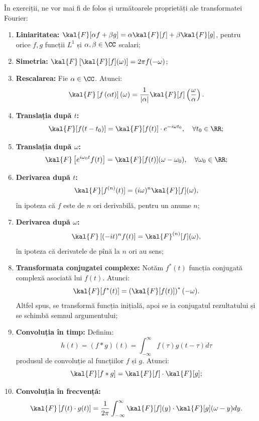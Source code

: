 În exerciții, ne vor mai fi de folos și următoarele proprietăți ale
transformatei Fourier:
\begin{enumerate}[(1)]
    \item \textbf{Liniaritatea:} $ \kal{F}[\alpha f + \beta g] = \alpha \kal{F}[f] + \beta \kal{F}[g] $,
        pentru orice $ f, g $ funcții $ L^1 $ și $ \alpha, \beta \in \CC $ scalari;
    \item \textbf{Simetria:} $ \kal{F}\left[\kal{F}[f](\omega)\right] = 2\pi f(-\omega) $;
    \item \textbf{Rescalarea:} Fie $ \alpha \in \CC $. Atunci:
        \[
            \kal{F}\left[f\left(\alpha t\right)\right](\omega) = %
            \dfrac{1}{|\alpha|}\kal{F}[f]\left(\dfrac{\omega}{\alpha}\right).
        \]
    \item \textbf{Translația după $ t $:}
        \[
            \kal{F}[f(t - t_0)] = \kal{F}[f(t)] \cdot e^{-i\omega t_0}, %
            \quad \forall t_0 \in \RR;
        \]
    \item \textbf{Translația după $ \omega $:}
        \[
            \kal{F}\left[e^{i\omega_0 t}f(t)\right] = \kal{F}[f(t)](\omega - \omega_0), %
            \quad \forall \omega_0 \in \RR;
        \]
    \item \textbf{Derivarea după $ t $:}
        \[
            \kal{F}[f^{(n)}(t)] = (i\omega)^n \kal{F}[f](\omega),
        \]
        în ipoteza că $ f $ este de $ n $ ori derivabilă, pentru un anume $ n $;
    \item \textbf{Derivarea după $ \omega $:}
        \[
            \kal{F}\left[(-it)^n f(t)\right] = \kal{F}^{(n)}[f](\omega),
        \]
        în ipoteza că derivatele de pînă la $ n $ ori au sens;
    \item \textbf{Transformata conjugatei complexe:} Notăm $ f^\ast(t) $ funcția
        conjugată complexă asociată lui $ f(t) $. Atunci:
        \[
            \kal{F}[f^\ast(t)] = \left(\kal{F}[f(t)]\right)^\ast(-\omega).
        \]
        Altfel spus, se transformă funcția inițială, apoi se ia conjugatul
        rezultatului și se schimbă semnul argumentului;
    \item \textbf{Convoluția în timp:} Definim:
        \[
            h(t) = (f \ast g)(t) = \int_{-\infty}^\infty f(\tau)g(t - \tau)d\tau
        \]
        produsul de convoluție al funcțiilor $ f $ și $ g $.
        Atunci:
        \[
            \kal{F}[f \ast g] = \kal{F}[f] \cdot \kal{F}[g];
        \]
    \item \textbf{Convoluția în frecvență:}
        \[
            \kal{F}\left[f(t) \cdot g(t)\right] = %
            \dfrac{1}{2 \pi} \int_{-\infty}^\infty \kal{F}[f](y) \cdot \kal{F}[g](\omega - y)dy.
        \]
\end{enumerate}

